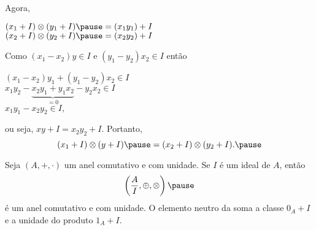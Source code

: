 \documentclass{beamer}
\begin{document}
    \begin{frame}
        Agora,\pause 
        \begin{center}
            $(x_1 + I) \otimes (y_1 + I) \pause = (x_1y_1) + I$\pause\\
            $(x_2 + I) \otimes (y_2 + I) \pause = (x_2y_2) + I$\pause
        \end{center}

        Como $(x_1 - x_2)y \in I$ \pause e $(y_1 - y_2)x_2 \in I$ \pause ent\~ao\pause
        \begin{center}
            $(x_1 - x_2)y_1 + (y_1 - y_2)x_2 \in I$\pause\\
            $x_1y_2-\underbrace{x_2y_1 + y_1x_2}_{= 0} - y_2x_2 \in I$\pause\\
            $x_1y_1 - x_2y_2\in I,$\pause 
        \end{center}
        ou seja, \pause $xy + I = x_2y_2 + I$. \pause Portanto,\pause 
        \[
            (x_1 + I) \otimes (y + I) \pause = (x_2 + I) \otimes (y_2 + I).\pause
        \]
    \end{frame}

    \begin{frame}
        \begin{teorema}
            Seja $(A, +, \cdot)$ um anel comutativo \pause e com unidade. \pause Se $I$ {\'e} um ideal de $A$, \pause ent\~ao
            \[
                \left(\dfrac{A}{I}, \oplus, \otimes\right)\pause 
            \]
            {\'e} um anel comutativo \pause e com unidade. \pause O elemento neutro da soma  a classe $0_{A} + I$ \pause e a unidade do produto  $1_{A} + I$.\pause
        \end{teorema}
    \end{frame}
\end{document}
